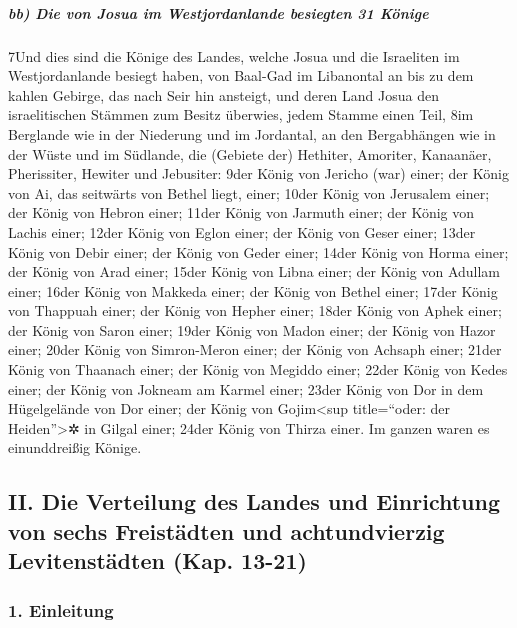 \hypertarget{bb-die-von-josua-im-westjordanlande-besiegten-31-kuxf6nige}{%
\subparagraph{bb) Die von Josua im Westjordanlande besiegten 31
Könige}\label{bb-die-von-josua-im-westjordanlande-besiegten-31-kuxf6nige}}

7Und dies sind die Könige des Landes, welche Josua und die Israeliten im
Westjordanlande besiegt haben, von Baal-Gad im Libanontal an bis zu dem
kahlen Gebirge, das nach Seir hin ansteigt, und deren Land Josua den
israelitischen Stämmen zum Besitz überwies, jedem Stamme einen Teil, 8im
Berglande wie in der Niederung und im Jordantal, an den Bergabhängen wie
in der Wüste und im Südlande, die (Gebiete der) Hethiter, Amoriter,
Kanaanäer, Pherissiter, Hewiter und Jebusiter: 9der König von Jericho
(war) einer; der König von Ai, das seitwärts von Bethel liegt, einer;
10der König von Jerusalem einer; der König von Hebron einer; 11der König
von Jarmuth einer; der König von Lachis einer; 12der König von Eglon
einer; der König von Geser einer; 13der König von Debir einer; der König
von Geder einer; 14der König von Horma einer; der König von Arad einer;
15der König von Libna einer; der König von Adullam einer; 16der König
von Makkeda einer; der König von Bethel einer; 17der König von Thappuah
einer; der König von Hepher einer; 18der König von Aphek einer; der
König von Saron einer; 19der König von Madon einer; der König von Hazor
einer; 20der König von Simron-Meron einer; der König von Achsaph einer;
21der König von Thaanach einer; der König von Megiddo einer; 22der König
von Kedes einer; der König von Jokneam am Karmel einer; 23der König von
Dor in dem Hügelgelände von Dor einer; der König von Gojim\textless sup
title=``oder: der Heiden''\textgreater✲ in Gilgal einer; 24der König von
Thirza einer. Im ganzen waren es einunddreißig Könige.

\hypertarget{ii.-die-verteilung-des-landes-und-einrichtung-von-sechs-freistuxe4dten-und-achtundvierzig-levitenstuxe4dten-kap.-13-21}{%
\subsection{II. Die Verteilung des Landes und Einrichtung von sechs
Freistädten und achtundvierzig Levitenstädten (Kap.
13-21)}\label{ii.-die-verteilung-des-landes-und-einrichtung-von-sechs-freistuxe4dten-und-achtundvierzig-levitenstuxe4dten-kap.-13-21}}

\hypertarget{einleitung}{%
\subsubsection{1. Einleitung}\label{einleitung}}

